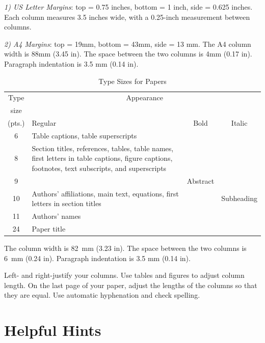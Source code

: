 {\em 1) US Letter Margins}:  top = 0.75 inches, bottom = 1 inch, side = 0.625 inches. 
Each column measures 3.5 inches wide, with a 0.25-inch measurement between columns.

{\em 2) A4 Margins}: top = 19mm, bottom = 43mm, side = 13 mm. The A4 column width is 
88mm (3.45 in). The space between the two columns is 4mm (0.17 in). Paragraph indentation 
is 3.5 mm (0.14 in).

\begin{table}[hb]
\begin{center} \caption{Type Sizes for Papers}
\label{table1}
\renewcommand{\arraystretch}{1.3}
\begin{tabular}{|c|p{34mm}|c|c|}
 \hline
Type & \multicolumn{3}{c|}{Appearance} \\
size &\multicolumn{3}{c|}{~} \\ \cline{2-4} (pts.) & Regular &
Bold & Italic \\ \hline
 6 & Table captions\footnotemark[1], table superscripts & & \\ \hline
 8 & Section titles\footnotemark[1], references, tables, table
 names\footnotemark[1],
 first letters in table captions\footnotemark[1], figure captions, footnotes,
 text subscripts, and superscripts &
& \\ \hline
 9 & & Abstract & \\ \hline
 10 & Authors' affiliations, main text, equations, first letters in
 section titles\footnotemark[1] & & Subheading \\ \hline
 11 & Authors' names & & \\ \hline
 24 & Paper title & & \\ \hline
\end{tabular}
\end{center}
\end{table}

The column width is 82~mm (3.23 in). The space between the two columns is
6~mm (0.24 in). Paragraph indentation is 3.5 mm (0.14 in).

Left- and right-justify your columns. Use tables and figures to
adjust column length. On the last page of your paper, adjust the
lengths of the columns so that they are equal. Use automatic
hyphenation and check spelling.


\section{Helpful Hints}

